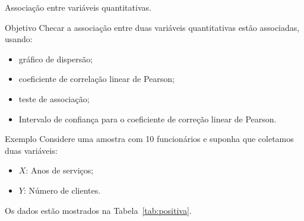 \documentclass[9pt]{beamer}
\begin{document}
\begin{frame}{Associação entre variáveis quantitativas.}

\scriptsize
\begin{block}{Objetivo}
	Checar a associação entre duas variáveis  quantitativas estão associadas, usando:
	\begin{itemize}
		\item gráfico de dispersão;
		\item coeficiente de correlação linear de Pearson;
		\item teste de associação;
		\item Intervalo de confiança para o coeficiente de correção linear de Pearson.
	\end{itemize}
\end{block}


\begin{block}{Exemplo}
	Considere uma amostra com 10 funcionários e suponha que coletamos duas variáveis:
	\begin{itemize}
		\item $X$: Anos de serviços;
		\item $Y$: Número de clientes.
	\end{itemize}
	Os dados estão mostrados na Tabela~\ref{tab:positiva}.
		\begin{table}[ht]
		\centering
		\caption{Amostra de 10 corretores de seguros.} 
		\label{tab:positiva}
	\end{table}
\end{block}
\normalsize
\end{frame}
\end{document}
